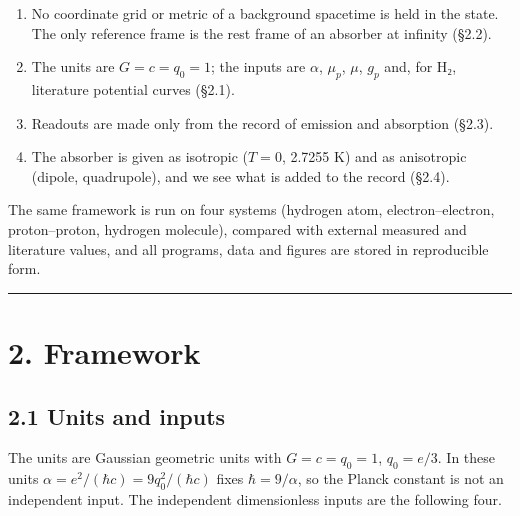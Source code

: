 \documentclass[
  a4paper,
]{article}
\providecommand{\tightlist}{%
  \setlength{\itemsep}{0pt}\setlength{\parskip}{0pt}}
\begin{document}
\begin{enumerate}
\def\labelenumi{\arabic{enumi}.}
\tightlist
\item
  No coordinate grid or metric of a background spacetime is held in the
  state. The only reference frame is the rest frame of an absorber at
  infinity (§2.2).
\item
  The units are \(G=c=q_0=1\); the inputs are \(\alpha\), \(\mu_p\),
  \(\mu\), \(g_p\) and, for H₂, literature potential curves (§2.1).
\item
  Readouts are made only from the record of emission and absorption
  (§2.3).
\item
  The absorber is given as isotropic (\(T=0\), 2.7255 K) and as
  anisotropic (dipole, quadrupole), and we see what is added to the
  record (§2.4).
\end{enumerate}

The same framework is run on four systems (hydrogen atom,
electron--electron, proton--proton, hydrogen molecule), compared with
external measured and literature values, and all programs, data and
figures are stored in reproducible form.

\begin{center}\rule{0.5\linewidth}{0.5pt}\end{center}

\section{2. Framework}\label{framework}

\subsection{2.1 Units and inputs}\label{units-and-inputs}

The units are Gaussian geometric units with \(G=c=q_0=1\), \(q_0=e/3\).
In these units \(\alpha=e^2/(\hbar c)=9q_0^2/(\hbar c)\) fixes
\(\hbar=9/\alpha\), so the Planck constant is not an independent input.
The independent dimensionless inputs are the following four.
\end{document}
